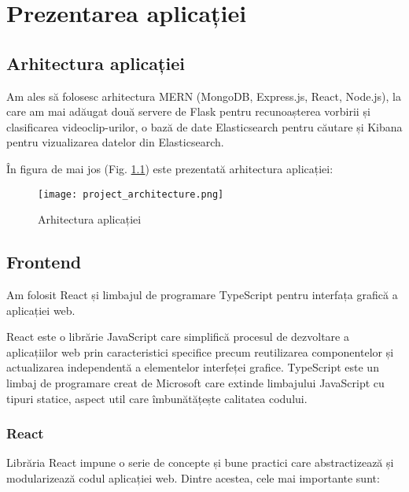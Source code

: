 \chapter{Prezentarea aplicației}

\section{Arhitectura aplicației}
Am ales să folosesc arhitectura MERN (MongoDB, Express.js, React, Node.js), la care am mai adăugat
două servere de Flask pentru recunoașterea vorbirii și clasificarea videoclip-urilor, o bază de
date Elasticsearch pentru căutare și Kibana pentru vizualizarea datelor din Elasticsearch.
\par
În figura de mai jos (Fig. \ref{fig:project-architecture}) este prezentată arhitectura aplicației:

\begin{figure}[h]
    \centering
    \texttt{[image: project\_architecture.png]}
    \caption{Arhitectura aplicației}
    \label{fig:project-architecture}
\end{figure}


\section{Frontend}
Am folosit React și limbajul de programare TypeScript pentru interfața grafică a aplicației web. 
\par
React este o librărie JavaScript care simplifică procesul de dezvoltare a aplicațiilor web prin 
caracteristici specifice precum reutilizarea componentelor și actualizarea independentă a
elementelor interfeței grafice. TypeScript este un limbaj de programare creat de Microsoft care
extinde limbajului JavaScript cu tipuri statice, aspect util care îmbunătățește calitatea codului.

\subsection{React}
Librăria React impune o serie de concepte și bune practici care abstractizează și modularizează
codul aplicației web. Dintre acestea, cele mai importante sunt:

